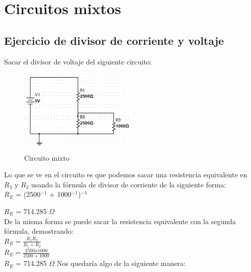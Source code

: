 \documentclass[a4paper,11pt]{article}
\begin{document}
\section{Circuitos mixtos}
\subsection{Ejercicio de divisor de corriente y voltaje}
\noindent Sacar el divisor de voltaje del siguiente circuito:

\begin{figure}[H]
    \centering
     \includegraphics[width=0.5\textwidth]{images/circuito mixto1.PNG}
     \caption{Circuito mixto}
     \label{fig:cm}
\end{figure}
\noindent Lo que se ve en el circuito es que podemos sacar una resistencia equivalente en $R_3$ y $R_2$ usando la fórmula de divisor de corriente de la siguiente forma:
\vspace{0.2cm}\\
$R_E$ = (2500$^{-1}$ + 1000$^{-1}$)$^{-1}$

$R_E$ = 714.285 $\Omega$
\vspace{0.2cm}\\
\noindent De la misma forma se puede sacar la resistencia equivalente con la segunda fórmula, demostrando:
\vspace{0.2cm}\\
$R_E = \frac{R_1R_2}{R_1+R_2}$
\vspace{0.3cm}\\
$R_E = \frac{2500x1000}{2500+1000}$
\vspace{0.3cm}\\
$R_E$ = 714.285 $\Omega$
\newpage
Nos quedaría algo de la siguiente manera:
\end{document}
